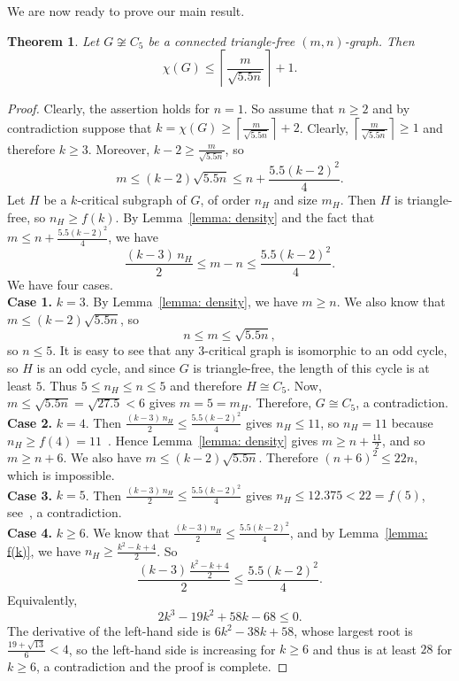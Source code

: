 \documentclass{amsart}
\theoremstyle{plain}
\newtheorem{theorem}{Theorem}
\begin{document}
We are now ready to prove our main result.

\begin{theorem} \label{theorem: triangle-free main}
Let $G \not\cong C_5$ be a connected triangle-free $(m,n)$-graph. Then
$$
\chi(G) \leq \left\lceil \frac{m}{\sqrt{5.5n}} \right\rceil + 1.
$$
\end{theorem}

\begin{proof}
Clearly, the assertion holds for $n=1$. So assume that $n \geq 2$ and by contradiction suppose that $k = \chi(G) \geq \left\lceil \frac{m}{\sqrt{5.5n}} \right\rceil + 2$. Clearly, $\left\lceil \frac{m}{\sqrt{5.5n}} \right\rceil \geq 1$ and therefore $k \geq 3$. Moreover, $k - 2 \geq \frac{m}{\sqrt{5.5n}}$, so
$$
m \leq (k-2)\sqrt{5.5n} \leq n + \frac{5.5(k-2)^2}{4}.
$$
Let $H$ be a $k$-critical subgraph of $G$, of order $n_H$ and size $m_H$. Then $H$ is triangle-free, so $n_H \geq f(k)$. By Lemma~\ref{lemma: density} and the fact that $m \leq n + \frac{5.5(k-2)^2}{4}$, we have
$$
\frac{(k-3)\,n_H}{2} \leq m-n \leq \frac{5.5(k-2)^2}{4}.
$$
We have four cases.
\\

\noindent \textbf{Case 1.} $k = 3$. By Lemma~\ref{lemma: density}, we have $m \geq n$. We also know that $m \leq (k-2) \sqrt{5.5n}$, so
$$
n \leq m \leq \sqrt{5.5n},
$$
so $n \leq 5$. It is easy to see that any $3$-critical graph is isomorphic to an odd cycle, so $H$ is an odd cycle, and since $G$ is triangle-free, the length of this cycle is at least $5$. Thus $5 \leq n_H \leq n \leq 5$ and therefore $H \cong C_5$. Now, $m \leq \sqrt{5.5n} = \sqrt{27.5} < 6$ gives $m = 5 = m_H$. Therefore, $G \cong C_5$, a contradiction.
\\

\noindent \textbf{Case 2.} $k = 4$. Then $\frac{(k-3)\,n_H}{2} \leq \frac{5.5(k-2)^2}{4}$ gives $n_H \leq 11$, so $n_H = 11$ because $n_H \geq f(4) = 11$~\cite{chvatal1974minimality}. Hence Lemma~\ref{lemma: density} gives $m \geq n + \frac{11}{2}$, and so $m \geq n+6$. We also have $m \leq (k-2)\sqrt{5.5n}$. Therefore $(n+6)^2 \leq 22n$, which is impossible.
\\

\noindent \textbf{Case 3.} $k = 5$. Then $\frac{(k-3)\,n_H}{2} \leq \frac{5.5(k-2)^2}{4}$ gives $n_H \leq 12.375 < 22 = f(5)$, see~\cite{jensen1995small}, a contradiction. 
\\

\noindent \textbf{Case 4.} $k \geq 6$. We know that $\frac{(k-3)\,n_H}{2} \leq \frac{5.5(k-2)^2}{4}$, and by Lemma~\ref{lemma: f(k)}, we have $n_H \geq \frac{k^2-k+4}{2}$. So
$$
\frac{(k-3)\,\frac{k^2-k+4}{2}}{2} \leq \frac{5.5(k-2)^2}{4}.
$$
Equivalently,
$$
2k^3-19k^2+58k-68 \leq 0.
$$
The derivative of the left-hand side is $6k^2-38k+58$, whose largest root is $\frac{19+\sqrt{13}}{6} < 4$, so the left-hand side is increasing for $k \geq 6$ and thus is at least $28$ for $k \geq 6$, a contradiction and the proof is complete.
\end{proof}
\end{document}
